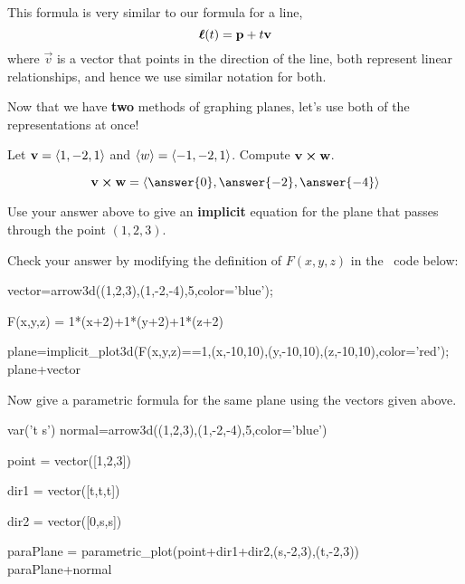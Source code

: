 \documentclass{ximera}
\begin{document}
This formula is very similar to our formula for a line,
\[
\boldsymbol{\ell}(t) = \mathbf{p} + t\mathbf{v}
\]
where $\vec{v}$ is a vector that points in the direction of the line,
both represent linear relationships, and hence we use similar notation
for both.

Now that we have \textbf{two} methods of graphing planes, let's use
both of the representations at once!

\begin{question}
  Let $\mathbf{v} = \left\langle 1,-2,1\right\rangle$ and $\left\langle w\right\rangle =
  \left\langle -1,-2,1\right\rangle$. Compute $\mathbf{v}\boldsymbol\times\mathbf{w}$.
  \begin{prompt}
    \[
    \vec{v}\cross\vec{w} = \vector{\answer{0},\answer{-2},\answer{-4}}
    \]
  \end{prompt}
  \begin{question}
    Use your answer above to give an \textbf{implicit} equation for
    the plane that passes through the point $(1,2,3)$.
    \begin{onlineOnly}
      Check your answer by modifying the definition of $F(x,y,z)$ in
      the \sage\ code below:
      \begin{sageCell}
vector=arrow3d((1,2,3),(1,-2,-4),5,color='blue');
        
F(x,y,z) = 1*(x+2)+1*(y+2)+1*(z+2)

plane=implicit_plot3d(F(x,y,z)==1,(x,-10,10),(y,-10,10),(z,-10,10),color='red');
plane+vector
      \end{sageCell}
    \end{onlineOnly}
    \begin{question}
      Now give a parametric formula for the same plane using the vectors given above.
      \begin{sageCell}
var('t s')
normal=arrow3d((1,2,3),(1,-2,-4),5,color='blue')

point = vector([1,2,3])

dir1 = vector([t,t,t])

dir2 = vector([0,s,s])

paraPlane = parametric_plot(point+dir1+dir2,(s,-2,3),(t,-2,3))
paraPlane+normal
      \end{sageCell}
    \end{question}
  \end{question}
\end{question}
\end{document}
